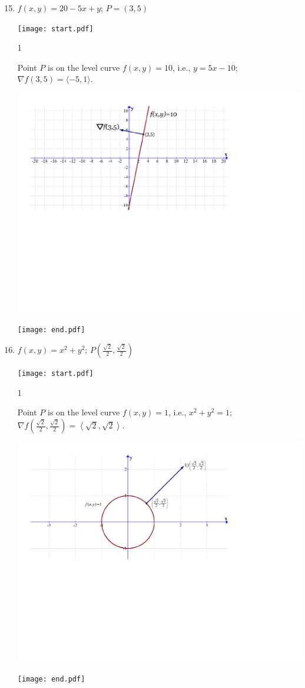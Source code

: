 \documentclass[12pt]{article}
\begin{document}
\begin{enumerate}
\setcounter{enumi}{14}

\item $f(x,y)=20-5x+y$; $P=(3, 5)$

\texttt{[image: start.pdf]}
{{{1\linewidth}{Point $P$ is on the level curve $f(x,y)=10$, i.e., $y=5x-10$; $\nabla f(3,5)=\langle -5,1 \rangle$.
\begin{center}
\includegraphics[scale=0.6]{normal.pdf}
\end{center}
}}}
\texttt{[image: end.pdf]}


\item $f(x,y)=x^2+y^2$; $P\left(\frac{\sqrt{2}}{2},\frac{\sqrt{2}}{2}\right)$

\texttt{[image: start.pdf]}
{{{1\linewidth}{Point $P$ is on the level curve $f(x,y)=1$, i.e., $x^2+y^2=1$; $\nabla f \left(\frac{\sqrt{2}}{2},\frac{\sqrt{2}}{2}\right)=\left\langle \sqrt{2},\sqrt{2} \right\rangle$.
\begin{center}
\includegraphics[scale=0.5]{normal2.pdf}
\end{center}
}}}
\texttt{[image: end.pdf]}



\end{enumerate}
\end{document}
